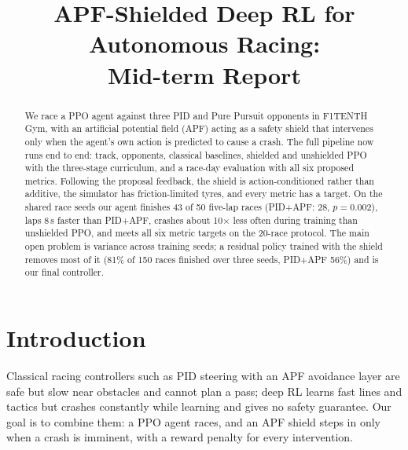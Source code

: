 \documentclass[conference]{IEEEtran}
\begin{document}
\title{APF-Shielded Deep RL for Autonomous Racing:\\Mid-term Report}

\author{
\and
{}
\and
{}
}

\maketitle

\begin{abstract}
We race a PPO agent against three PID and Pure Pursuit opponents in F1TENTH Gym, with an artificial potential
field (APF) acting as a safety shield that intervenes only when the agent's own action is predicted to cause a
crash. The full pipeline now runs end to end: track, opponents, classical baselines, shielded and unshielded PPO
with the three-stage curriculum, and a race-day evaluation with all six proposed metrics. Following the proposal
feedback, the shield is action-conditioned rather than additive, the simulator has friction-limited tyres, and
every metric has a target. On the shared race seeds our agent finishes 43 of 50 five-lap races (PID+APF: 28,
$p=0.002$), laps 8\,s faster than PID+APF, crashes about 10$\times$ less often during training than unshielded
PPO, and meets all six metric targets on the 20-race protocol. The main open problem is variance across training
seeds; a residual policy trained with the shield removes most of it (81\% of 150 races finished over three
seeds, PID+APF 56\%) and is our final controller.
\end{abstract}

\section{Introduction}
Classical racing controllers such as PID steering with an APF avoidance layer are safe but slow near obstacles and
cannot plan a pass; deep RL learns fast lines and tactics but crashes constantly while learning and gives no safety
guarantee. Our goal is to combine them: a PPO agent races, and an APF shield steps in only when a crash is
imminent, with a reward penalty for every intervention.
\end{document}
